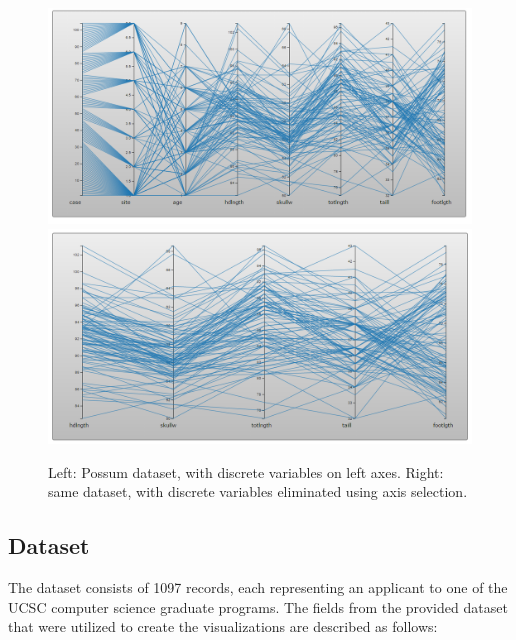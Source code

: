 \documentclass[]{article}
\begin{document}
		\begin{figure}[h]
			\includegraphics[width=\linewidth/2]{possum_bad.png}
			\includegraphics[width=\linewidth/2]{possum_good.png}
			\caption{Left: Possum dataset\cite{datasets}, with discrete variables on left axes. Right: same dataset, with discrete variables eliminated using axis selection.}
			\label{fig:Axis}
		\end{figure}
		
	\subsection{Dataset}
		The dataset consists of 1097 records, each representing an applicant to one of the UCSC computer science graduate programs. The fields from the provided dataset that were utilized to create the visualizations are described as follows:
		
\end{document}
